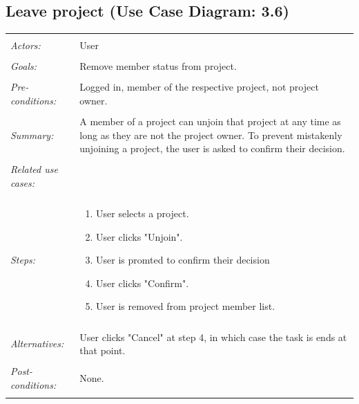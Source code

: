 \documentclass[11pt]{report}
\begin{document}
\subsection{Leave project (Use Case Diagram: 3.6)}
\begin{tabular}{ p{2cm} p{12cm} }
 \hline
 \\
 \textit{Actors:} & User \\ 
 \\
 \textit{Goals:} & Remove member status from project. \\
 \\
 \textit{Pre-conditions:} & Logged in, member of the respective project, not project owner.  \\
\\
 \textit{Summary:} & A member of a project can unjoin that project at any time as long as they are not the project owner. To prevent mistakenly unjoining a project, the user is asked to confirm their decision.\\ 
 \\
 \textit{Related use cases:} & \\ 
 \\
 \textit{Steps:} & \begin{enumerate}
  \item User selects a project.
  \item User clicks "Unjoin". 
  \item User is promted to confirm their decision
  \item User clicks "Confirm".
  \item User is removed from project member list.    
 \end{enumerate} \\
 \\
 \textit{Alternatives:} & User clicks "Cancel" at step 4, in which case the task is ends at that point. \\
 \\
 \textit{Post-conditions:} & None. \\
 \\
\hline
\end{tabular}
\end{document}
